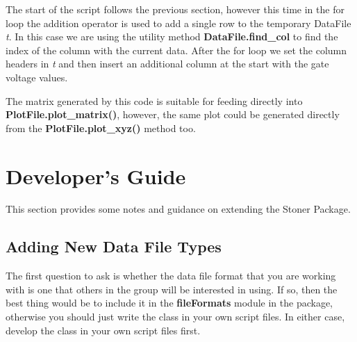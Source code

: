 \documentclass[a4paper,11pt]{scrartcl}
\begin{document}
The start of the script follows the previous section, however this time in the
for loop the addition operator is used to add a single row to the temporary
DataFile \textit{t}. In this case we are using the utility method
\textbf{DataFile.find\_col} to find the index of the column with the current
data. After the for loop we set the column headers in \textit{t} and then insert
an additional column at the start with the gate voltage values.

The matrix generated by this code is suitable for feeding directly into \textbf{PlotFile.\linebreak plot\_matrix()}, however, the same plot could be generated directly from the \linebreak\textbf{PlotFile.plot\_xyz()} method too.

\section{Developer's Guide}

This section provides some notes and guidance on extending the Stoner Package. 

\subsection{Adding New Data File Types}

The first question to ask is whether the data file format that you are working with is one that others in the group will be interested in using. If so, then the best thing would be to include it in the \textbf{fileFormats} module in the package, otherwise you should just write the class in your own script files. In either case, develop the class in your own script files first.
\end{document}
